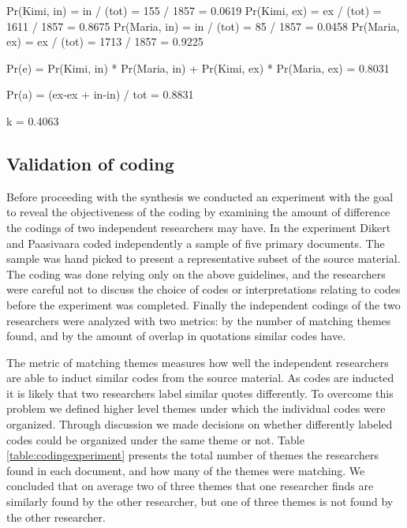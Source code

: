 \documentclass[preprint,authoryear,12pt]{elsarticle}
\begin{document}
Pr(Kimi, in) = in / (tot)  =  155 / 1857 = 0.0619
Pr(Kimi, ex) = ex / (tot)  = 1611 / 1857 = 0.8675
Pr(Maria, in) = in / (tot) =   85 / 1857 = 0.0458
Pr(Maria, ex) = ex / (tot) = 1713 / 1857 = 0.9225

Pr(e) = Pr(Kimi, in) * Pr(Maria, in) + Pr(Kimi, ex) * Pr(Maria, ex) = 0.8031

Pr(a) = (ex-ex + in-in) / tot = 0.8831

k = 0.4063


\subsection{Validation of coding}

Before proceeding with the synthesis we conducted an experiment with the goal to
reveal the objectiveness of the coding by examining the amount of difference the
codings of two independent researchers may have. In the experiment Dikert and
Paasivaara coded independently a sample of five primary documents. The sample
was hand picked to present a representative subset of the source material. The
coding was done relying only on the above guidelines, and the researchers were
careful not to discuss the choice of codes or interpretations relating to codes
before the experiment was completed. Finally the independent codings of the two
researchers were analyzed with two metrics: by the number of matching themes
found, and by the amount of overlap in quotations similar codes have.

The metric of matching themes measures how well the independent researchers are
able to induct similar codes from the source material. As codes are inducted it
is likely that two researchers label similar quotes differently. To overcome
this problem we defined higher level themes under which the individual codes
were organized. Through discussion we made decisions on whether differently
labeled codes could be organized under the same theme or not. Table
\ref{table:codingexperiment} presents the total number of themes the researchers
found in each document, and how many of the themes were matching. We concluded
that on average two of three themes that one researcher finds are similarly
found by the other researcher, but one of three themes is not found by the
other researcher.
\end{document}
